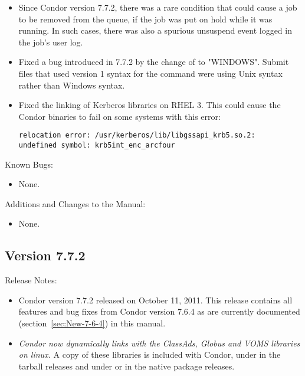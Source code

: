 \begin{itemize}
\item Since Condor version 7.7.2, there was a rare condition that could cause
a job to be removed from the queue,
if the job was put on hold while it was running.
In such cases, there was also a spurious
unsuspend event logged in the job's user log.

\item Fixed a bug introduced in 7.7.2 by the change of  to "WINDOWS".
Submit files that used version 1 syntax for the  command
were using Unix syntax rather than Windows syntax.

\item Fixed the linking of Kerberos libraries on RHEL 3. This could cause
the Condor binaries to fail on some systems with this error:
\begin{verbatim}
relocation error: /usr/kerberos/lib/libgssapi_krb5.so.2: 
undefined symbol: krb5int_enc_arcfour
\end{verbatim}

\end{itemize}

\noindent Known Bugs:

\begin{itemize}

\item None.

\end{itemize}

\noindent Additions and Changes to the Manual:

\begin{itemize}

\item None.

\end{itemize}


\subsection*{\label{sec:New-7-7-2}Version 7.7.2}

\noindent Release Notes:

\begin{itemize}

\item Condor version 7.7.2 released on October 11, 2011.
This release contains all features and bug fixes from Condor version 7.6.4
as are currently documented (section~\ref{sec:New-7-6-4}) in this manual. 

\item
\emph{Condor now dynamically links with the ClassAds, Globus and VOMS libraries on
linux.}
A copy of these libraries is included with Condor, under
 in the tarball releases and under
 or  in the native package
releases.

\end{itemize}


